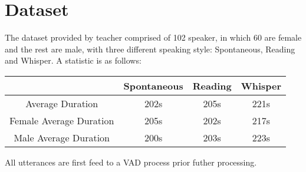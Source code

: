 \section{Dataset}
	The dataset provided by teacher comprised of 102 speaker, in which 60 are
	female and the rest are male, with three different speaking style: Spontaneous,
	Reading and Whisper. A statistic is as follows:
	\begin{table}[!ht]
		\centering
		\begin{tabular}{|c|c|c|c|}
			\hline
			& Spontaneous & Reading & Whisper \\\hline
			Average Duration & 202s & 205s & 221s \\\hline
			Female Average Duration & 205s & 202s & 217s \\\hline
			Male Average Duration & 200s & 203s & 223s \\\hline
		\end{tabular}
	\end{table}
	All utterances are first feed to a VAD process prior futher processing.
